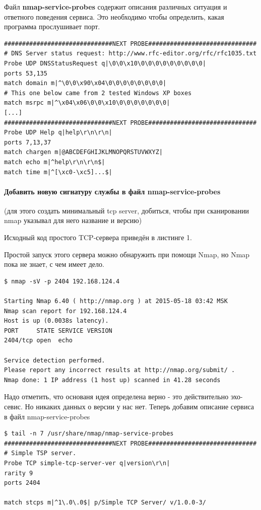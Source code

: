 \documentclass[a4paper, 12pt]{article}		%
\begin{document}
Файл \textbf{nmap-service-probes} содержит описания различных ситуация и ответного поведения сервиса. Это необходимо чтобы определить, какая программа прослушивает порт.

\begin{Verbatim}[frame=single]
##############################NEXT PROBE##############################
# DNS Server status request: http://www.rfc-editor.org/rfc/rfc1035.txt
Probe UDP DNSStatusRequest q|\0\0\x10\0\0\0\0\0\0\0\0\0|
ports 53,135
match domain m|^\0\0\x90\x04\0\0\0\0\0\0\0\0|
# This one below came from 2 tested Windows XP boxes
match msrpc m|^\x04\x06\0\0\x10\0\0\0\0\0\0\0|
[...]
##############################NEXT PROBE##############################
Probe UDP Help q|help\r\n\r\n|
ports 7,13,37
match chargen m|@ABCDEFGHIJKLMNOPQRSTUVWXYZ|
match echo m|^help\r\n\r\n$|
match time m|^[\xc0-\xc5]...$|
\end{Verbatim}

\paragraph{Добавить новую сигнатуру службы в файл nmap-service-probes} (для этого создать минимальный tcp server, добиться, чтобы при сканировании nmap указывал для него название и версию)

Исходный код простого TCP-сервера приведён в листинге 1.



Простой запуск этого сервера можно обнаружить при помощи Nmap, но Nmap пока не знает, с чем имеет дело.

\begin{Verbatim}[frame=single]
$ nmap -sV -p 2404 192.168.124.4

Starting Nmap 6.40 ( http://nmap.org ) at 2015-05-18 03:42 MSK
Nmap scan report for 192.168.124.4
Host is up (0.0038s latency).
PORT     STATE SERVICE VERSION
2404/tcp open  echo

Service detection performed.
Please report any incorrect results at http://nmap.org/submit/ .
Nmap done: 1 IP address (1 host up) scanned in 41.28 seconds
\end{Verbatim}

Надо отметить, что основаня идея определена верно - это действительно эхо-севис. Но никаких данных о версии у нас нет. Теперь добавим описание сервиса в файл nmap-service-probes
\begin{Verbatim}[frame=single]
$ tail -n 7 /usr/share/nmap/nmap-service-probes
##############################NEXT PROBE##############################
# Simple TSP server.
Probe TCP simple-tcp-server-ver q|version\r\n|
rarity 9
ports 2404

match stcps m|^1\.0\.0$| p/Simple TCP Server/ v/1.0.0-3/
\end{Verbatim}
\end{document}
